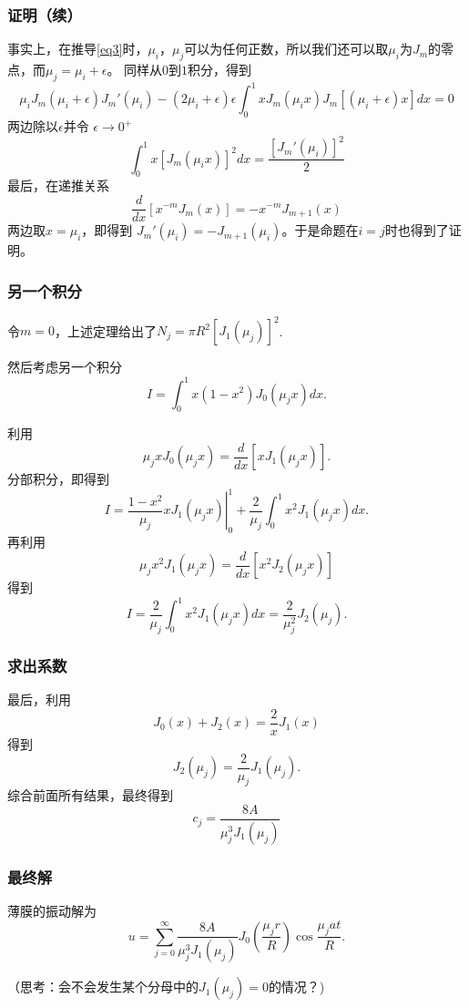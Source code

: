 \documentclass[CJK]{beamer}
\begin{document}
\begin{frame}
  \frametitle{证明（续）}
  
  事实上，在推导\eqref{eq3}时，$\mu_i$，$\mu_j$可以为任何正数，所以我们还可以取$\mu_i$为$J_m$的零点，而$\mu_j = \mu_i +\epsilon$。
    同样从$0$到$1$积分，得到
    $$ \mu_iJ_m(\mu_i+\epsilon) J_m'(\mu_i)  -(2\mu_i+\epsilon)\epsilon\int_0^1xJ_m(\mu_ix)J_m[(\mu_i+\epsilon)x]dx = 0 $$
    两边除以$\epsilon$并令 $\epsilon\rightarrow 0^+$
    $$ \int_0^1x\left[J_m(\mu_ix)\right]^2dx = \frac{[J_m'(\mu_i)]^2}{2} $$
    最后，在递推关系
    $$\frac{d}{dx}\left[x^{-m}J_m(x)\right] = -x^{-m} J_{m+1}(x)$$
  两边取$x = \mu_i$，即得到 $J_m'(\mu_i) = -J_{m+1}(\mu_i)$。于是命题在$i=j$时也得到了证明。
    
  
\end{frame}


\begin{frame}
  \frametitle{另一个积分}
  令$m=0$，上述定理给出了$N_j = \pi R^2\left[J_1(\mu_j)\right]^2$.

  然后考虑另一个积分
  $$I =   \int_0^1x\left(1-x^2\right)J_0(\mu_jx)dx. $$
\end{frame}

\begin{frame}
  利用
  $$ \mu_jxJ_0(\mu_j x) = \frac{d}{dx} \left[xJ_1(\mu_jx)\right]. $$
  分部积分，即得到
  $$I = \left.\frac{1-x^2}{\mu_j} xJ_1(\mu_jx) \right\vert_0^1 + \frac{2}{\mu_j} \int_0^1 x^2J_1(\mu_jx) dx. $$
  再利用
  $$\mu_jx^2J_1(\mu_j x) = \frac{d}{dx}\left[x^2J_2(\mu_j x)\right] $$
  得到
  $$I  =  \frac{2}{\mu_j} \int_0^1 x^2J_1(\mu_jx) dx = \frac{2}{\mu_j^2}J_2(\mu_j). $$
  
\end{frame}


\begin{frame}
  \frametitle{求出系数}
  
  最后，利用
  $$J_0(x)+J_2(x) = \frac{2}{x}J_1(x)$$
  得到
  $$J_2(\mu_j) = \frac{2}{\mu_j}J_1(\mu_j).$$
  综合前面所有结果，最终得到
  $$ c_j = \frac{8A}{\mu_j^3J_1(\mu_j)} $$
  
\end{frame}


\begin{frame}
  \frametitle{最终解}
  
  薄膜的振动解为
  $$ u = \sum_{j=0}^\infty \frac{8A}{\mu_j^3J_1(\mu_j)}J_0\left( \frac{\mu_jr}{R}\right)\cos\frac{\mu_jat}{R}. $$

  \skiplines

  （思考：会不会发生某个分母中的$J_1(\mu_j)=0$的情况？)
  
\end{frame}
\end{document}
